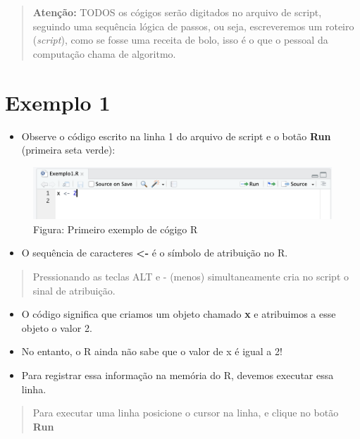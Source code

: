 \documentclass[
]{book}
\providecommand{\tightlist}{%
  \setlength{\itemsep}{0pt}\setlength{\parskip}{0pt}}
\begin{document}
\begin{quote}
\textbf{Atenção:} TODOS os cógigos serão digitados no arquivo de script, seguindo uma sequência lógica de passos, ou seja, escreveremos um roteiro (\emph{script}), como se fosse uma receita de bolo, isso é o que o pessoal da computação chama de algoritmo.
\end{quote}

\section{Exemplo 1}\label{exemplo-1}

\begin{itemize}
\tightlist
\item
  Observe o código escrito na linha 1 do arquivo de script e o botão \textbf{Run} (primeira seta verde):
\end{itemize}

\begin{figure}
\centering
\includegraphics{telaExemplo1.png}
\caption{Figura: Primeiro exemplo de cógigo R}
\end{figure}

\begin{itemize}
\tightlist
\item
  O sequência de caracteres \textbf{\textless-} é o símbolo de atribuição no R.
\end{itemize}

\begin{quote}
Pressionando as teclas ALT e - (menos) simultaneamente cria no script o sinal de atribuição.
\end{quote}

\begin{itemize}
\item
  O código significa que criamos um objeto chamado \textbf{x} e atribuimos a esse objeto o valor 2.
\item
  No entanto, o R ainda não sabe que o valor de x é igual a 2!
\item
  Para registrar essa informação na memória do R, devemos executar essa linha.
\end{itemize}

\begin{quote}
Para executar uma linha posicione o cursor na linha, e clique no botão \textbf{Run}
\end{quote}
\end{document}

